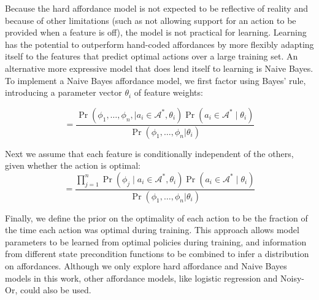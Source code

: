 \documentclass[letterpaper]{article}
\begin{document}
Because the hard affordance model is not expected to be reflective of
reality and because of other limitations (such as not allowing support
for an action to be provided when a feature is off), the model is not
practical for learning.  Learning has the potential to outperform
hand-coded affordances by more flexibly adapting itself to the
features that predict optimal actions over a large training set.  An
alternative more expressive model that does lend itself to learning is
Naive Bayes.  To implement a Naive Bayes affordance model, we first
factor using Bayes' rule, introducing a parameter vector $\theta_i$ of
feature weights:

\begin{equation}
= \frac{\Pr(\phi_1, \ldots, \phi_{n}, \mid a_i \in \mathcal{A}^*, \theta_i) \Pr(a_i \in \mathcal{A}^* \mid \theta_i)}{\Pr(\phi_1, \ldots, \phi_{n} | \theta_i)}
\label{eq:bayes}
\end{equation}

Next we assume that each feature is conditionally independent of the others, given whether the action is optimal:
\begin{equation}
= \frac{\prod_{j=1}^{n} \Pr(\phi_j \mid a_i \in \mathcal{A}^*, \theta_i) \Pr(a_i \in \mathcal{A}^* \mid \theta_i) }{\Pr(\phi_1, \ldots, \phi_{n} | \theta_i)}
\label{eq:final}
\end{equation}

Finally, we define the prior on the optimality of each action to be
the fraction of the time each action was optimal during training.
This approach allows model parameters to be learned from optimal
policies during training, and information from different state
precondition functions to be combined to infer a distribution on
affordances.  Although we only explore hard affordance and Naive Bayes
models in this work, other affordance models, like logistic regression
and Noisy-Or, could also be used.




\end{document}
